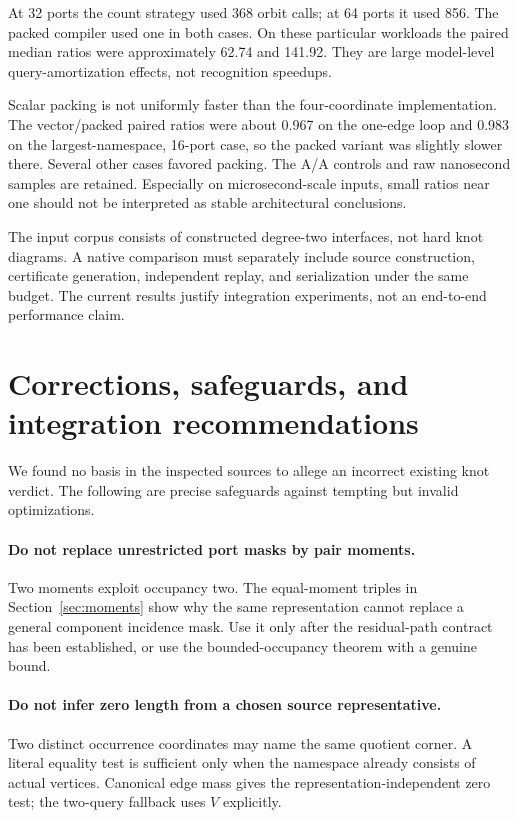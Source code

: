 \documentclass[11pt]{article}
\theoremstyle{definition}\newtheorem{definition}[theorem]{Definition}\newtheorem{example}[theorem]{Example}
\theoremstyle{remark}\newtheorem{remark}[theorem]{Remark}
\begin{document}
\begin{center}\small

\end{center}

At 32 ports the count strategy used 368 orbit calls; at 64 ports it used 856. The packed compiler used one in both cases. On these particular workloads the paired median ratios were approximately 62.74 and 141.92. They are large model-level query-amortization effects, not recognition speedups.

Scalar packing is not uniformly faster than the four-coordinate implementation. The vector/packed paired ratios were about 0.967 on the one-edge loop and 0.983 on the largest-namespace, 16-port case, so the packed variant was slightly slower there. Several other cases favored packing. The A/A controls and raw nanosecond samples are retained. Especially on microsecond-scale inputs, small ratios near one should not be interpreted as stable architectural conclusions.

The input corpus consists of constructed degree-two interfaces, not hard knot diagrams. A native comparison must separately include source construction, certificate generation, independent replay, and serialization under the same budget. The current results justify integration experiments, not an end-to-end performance claim.

\section{Corrections, safeguards, and integration recommendations}
\label{sec:corrections}
We found no basis in the inspected sources to allege an incorrect existing knot verdict. The following are precise safeguards against tempting but invalid optimizations.

\paragraph{Do not replace unrestricted port masks by pair moments.}
Two moments exploit occupancy two. The equal-moment triples in Section~\ref{sec:moments} show why the same representation cannot replace a general component incidence mask. Use it only after the residual-path contract has been established, or use the bounded-occupancy theorem with a genuine bound.

\paragraph{Do not infer zero length from a chosen source representative.}
Two distinct occurrence coordinates may name the same quotient corner. A literal equality test is sufficient only when the namespace already consists of actual vertices. Canonical edge mass gives the representation-independent zero test; the two-query fallback uses $V$ explicitly.
\end{document}
